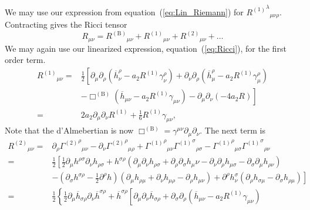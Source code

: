\documentclass[a4paper, 11pt, titlepage, twoside]{report}
\newcommand{\eqnref}[1]{equation~(\ref{eq:#1})}
\newcommand{\recip}[1]{\ensuremath{\frac{1}{#1}}}
\begin{document}
{\begin{equation}
\end{equation}
We may use our expression from \eqnref{Lin_Riemann} for ${{R^{(1)}}^\lambda}_{\mu\nu\rho}$. Contracting gives the Ricci tensor
\begin{equation}
{R}_{\mu\nu} = {R^{(\mathrm{B})}}_{\mu\nu} + {R^{(1)}}_{\mu\nu} + {R^{(2)}}_{\mu\nu} + \ldots
\end{equation}
We may again use our linearized expression, \eqnref{Ricci}, for the first order term.
\begin{align}
{R^{(1)}}_{\mu\nu} = {} & \frac{1}{2}\left[\partial_\mu\partial_\rho \left(\overline{h}^\rho_\nu - a_2 R^{(1)}\gamma^\rho_\nu\right) + \partial_\nu\partial_\rho \left(\overline{h}^\rho_\mu - a_2 R^{(1)}\gamma^\rho_\mu\right) \right. \nonumber \\
 & - \left. \Box^{(\mathrm{B})} \left(\overline{h}_{\mu\nu} - a_2 R^{(1)}\gamma_{\mu\nu}\right) - \partial_\mu\partial_\nu \left(-4a_2 R\right)\right] \\ \nonumber
 = {} & 2 a_2\partial_\mu\partial_\nu R^{(1)} + \recip{6} R^{(1)}\gamma_{\mu\nu},
\end{align}
Note that the d'Almebertian is now $\Box^{(\mathrm{B})} = \gamma^{\mu\nu}\partial_\mu\partial_\nu$. The next term is
\begin{align}
{R^{(2)}}_{\mu\nu} = {} & \partial_\rho {{\Gamma^{(2)}}^\rho}_{\mu\nu} - \partial_\nu {{\Gamma^{(2)}}^\rho}_{\mu\rho} + {{\Gamma^{(1)}}^\rho}_{\mu\nu}{{\Gamma^{(1)}}^\sigma}_{\rho\sigma} - {{\Gamma^{(1)}}^\rho}_{\mu\sigma}{{\Gamma^{(1)}}^\sigma}_{\rho\nu} \nonumber \\
 = {} & \frac{1}{2}\left[\frac{1}{2}\partial_\mu h^{\rho\sigma}\partial_\nu h_{\rho\sigma} + h^{\sigma\rho}\left(\partial_\mu\partial_\nu h_{\rho\sigma} + \partial_\rho\partial_\sigma h_\mu\nu - \partial_\nu\partial_\rho h_{\mu\sigma} - \partial_\sigma\partial_\mu h_{\rho\nu}\right) \right. \nonumber \\
 & - \left. \left(\partial_\sigma h^{\sigma\rho} - \frac{1}{2}\partial^\rho h\right)\left(\partial_\mu h_{\rho\mu} + \partial_\nu h_{\mu\rho} - \partial_\rho h_{\mu\nu}\right) + \partial^\rho h^\sigma_\nu\left(\partial_\rho h_{\sigma\mu} - \partial_\sigma h_{\rho\mu}\right) \right] \nonumber \\
 = {} & \frac{1}{2}\left\{\recip{2}\partial_\mu\overline{h}_{\sigma\rho}\partial_\nu\overline{h}^{\sigma\rho} + \overline{h}^{\sigma\rho}\left[\partial_\mu\partial_\nu\overline{h}_{\sigma\rho} + \partial_\sigma\partial_\rho\left(\overline{h}_{\mu\nu} - a_2 R^{(1)}\gamma_{\mu\nu}\right) \right.\right. \nonumber \\

\end{align}}
\end{document}
